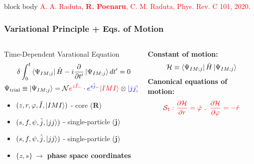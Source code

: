 \documentclass{beamer}
\begin{document}
\begin{frame}
\begin{figure}
	\end{figure}
	\vspace{-0.5cm}
	\begin{beamercolorbox}[rounded=true,shadow=false, wd=\linewidth,]{block body}
		\centering
		\textcolor{red}{\footnotesize{A. A. Raduta, \textbf{R. Poenaru}, C. M. Raduta, Phys. Rev. C 101, 2020.}}
	\end{beamercolorbox}
\end{frame}

\begin{frame}
	\frametitle{Variational Principle + Eqs. of Motion}
	\begin{columns}
		\begin{column}{0.6\textwidth}
			\begin{exampleblock}{Time-Dependent Varational Equation}
				\begin{align}
					\delta&\int_0^t\bra{\Psi_{IM;j}}\hat{H}-i\frac{\partial}{\partial t'}\ket{\Psi_{IM;j}}dt'=0\nonumber\\
					\Psi_\text{trial}&\equiv\ket{\Psi_{IM;j}}=\mathcal{N}{\color{red}e^{z\hat{I}_-}}\cdot{\color{blue}e^{s\hat{j}_-}}{\color{red}\ket{IMI}}\otimes{\color{blue}\ket{jj}}\nonumber
				\end{align}
				\vspace{-0.4cm}
				\begin{itemize}
					\item {\color{red}$(z,r,\varphi,\hat{I},\ket{IMI})$} - core ({\color{red}$\mathbf{R}$})
					\item {\color{blue}$(s,f,\psi,\hat{j},\ket{jj})$} - single-particle ({\color{blue}$\mathbf{j}$})
					\item {\color{blue}$(s,f,\psi,\hat{j},\ket{jj})$} - single-particle ({\color{blue}$\mathbf{j}$})
					\item $\{z,s\}\ \rightarrow$ \textbf{phase space coordinates}
				\end{itemize}
			\end{exampleblock}
		\end{column}
		\begin{column}{0.4\textwidth}
			\textbf{Constant of motion:}
			\begin{align}
				\mathcal{H}\equiv\bra{\Psi_{IM;j}}\hat{H}\ket{\Psi_{IM;j}}\nonumber
			\end{align}
			\textbf{Canonical equations of motion:}
			\begin{align}
				{\color{red}\mathcal{S}_1: \frac{\partial \mathcal{H}}{\partial r}=\dot{\varphi}\ ,\ \frac{\partial \mathcal{H}}{\partial \varphi}=-\dot{r}}\nonumber\\

\end{align}
\end{column}
\end{columns}
\end{frame}
\end{document}
